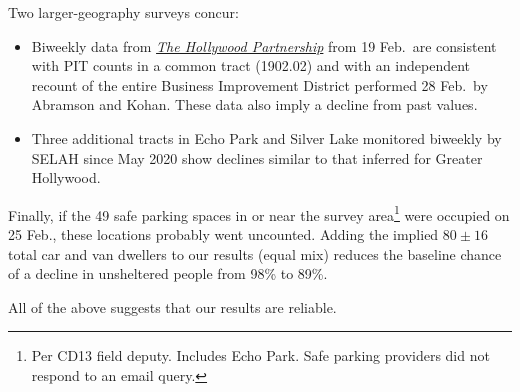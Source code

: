 \documentclass[11pt,twocolumn]{article}
\begin{document}
Two larger-geography surveys concur:%
\begin{itemize}
	\item Biweekly data from \href{https://hollywoodpartnership.com/}{\it The Hollywood Partnership} 
		from 19 Feb.\ are consistent with PIT counts in a common tract (1902.02) and with an independent 
		recount of the entire Business Improvement District performed 28 Feb.\ by Abramson and 
		Kohan. These data also imply a decline from past values.
	\item Three additional tracts in Echo Park and Silver Lake monitored biweekly by SELAH since May 2020 
		show declines similar to that inferred for Greater Hollywood.
\end{itemize}
%
%

Finally, if the 49 safe parking spaces in or near the survey area\footnote{Per CD13 field deputy. 
 Includes Echo Park. Safe parking providers did not respond to an email query.} 
were occupied on 25 Feb., these locations probably went uncounted. Adding the implied 
$80\pm16$ total car and van dwellers to our results (equal mix) reduces the baseline chance of a 
decline in unsheltered people from 98\% to 89\%. %

All of the above suggests that our results are reliable.

%
%
%
\end{document}
